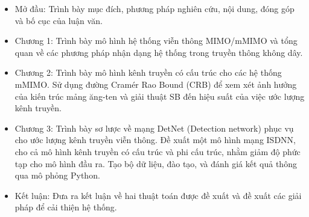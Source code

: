 \renewcommand{\labelitemi}{$-$}
\begin{itemize}
	\item Mở đầu: Trình bày mục đích, phương pháp nghiên cứu, nội dung, đóng góp và bố cục của luận văn.
	\item Chương 1: Trình bày mô hình hệ thống viễn thông MIMO/mMIMO và tổng quan về các phương pháp nhận dạng hệ thống trong truyền thông không dây.
    \item Chương 2: Trình bày mô hình kênh truyền có cấu trúc cho các hệ thống mMIMO. Sử dụng đường Cramér Rao Bound (CRB) để xem xét ảnh hưởng của kiến trúc mảng ăng-ten và giải thuật SB đến hiệu suất của việc ước lượng kênh truyền.
	\item Chương 3: Trình bày sơ lược về mạng DetNet (Detection network) phục vụ cho ước lượng kênh truyền viễn thông. Đề xuất một mô hình mạng ISDNN, cho cả mô hình kênh truyền có cấu trúc và phi cấu trúc, nhằm giảm độ phức tạp cho mô hình đầu ra. Tạo bộ dữ liệu, đào tạo, và đánh giá kết quả thông qua mô phỏng Python.
	\item Kết luận: Đưa ra kết luận về hai thuật toán được đề xuất và đề xuất các giải pháp để cải thiện hệ thống.
\end{itemize} 